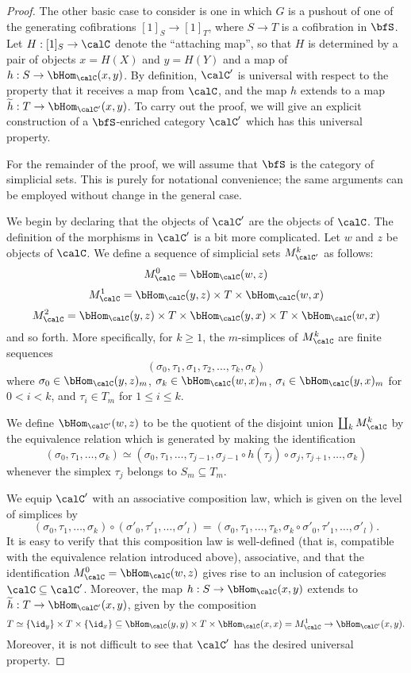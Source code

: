 \begin{Simplicial Categories}
\begin{proof}
The other basic case to consider is one in which $G$ is a pushout of one of the generating cofibrations $[1]_{S} \rightarrow [1]_{T}$, where $S \rightarrow T$ is a cofibration in $\bfS$. Let $H: [1]_{S} \rightarrow \calC$
denote the ``attaching map'', so that $H$ is determined by a pair of objects $x= H(X)$ and $y=H(Y)$
and a map of $h: S \rightarrow \bHom_{\calC}(x,y)$. 
By definition, $\calC'$ is universal
with respect to the property that it receives a map from $\calC$, and the map $h$ extends to a map
$\widetilde{h}: T \rightarrow \bHom_{\calC'}(x,y)$. To carry out the proof, we will give an explicit construction of a $\bfS$-enriched category $\calC'$ which has this universal property. 

For the remainder of the proof, we will assume that $\bfS$ is the category of simplicial sets.
This is purely for notational convenience; the same arguments can be employed without
change in the general case.

We begin by declaring that the objects of $\calC'$ are the objects of $\calC$. 
The definition of the morphisms in $\calC'$ is a bit more complicated. Let $w$ and $z$ be objects of $\calC$. We define a sequence of simplicial sets $M_{\calC'}^{k}$ as follows:
$$M_{\calC}^0 = \bHom_{\calC}(w,z)$$
$$M_{\calC}^1 = \bHom_{\calC}(y,z) \times T \times \bHom_{\calC}(w,x)$$
$$M_{\calC}^2 = \bHom_{\calC}(y,z) \times T \times \bHom_{\calC}(y,x) \times
T \times \bHom_{\calC}(w,x)$$ 
and so forth. More specifically, for $k \geq 1$, the $m$-simplices of $M_{\calC}^k$ are finite sequences
$$( \sigma_0, \tau_1, \sigma_1, \tau_2, \ldots, \tau_k, \sigma_k)$$ where 
$\sigma_0 \in \bHom_{\calC}(y,z)_m$, $\sigma_k \in \bHom_{\calC}(w,x)_m$, $\sigma_i \in \bHom_{\calC}(y,x)_m$ for $0 < i < k$, and $\tau_i \in T_m$ for $1 \leq i \leq k$.

We define $\bHom_{\calC'}(w,z)$ to be the quotient of the disjoint union
$ \coprod_{k} M_{\calC}^k$ by the equivalence relation which is generated by making the identification
$$( \sigma_0, \tau_1, \ldots, \sigma_k) \simeq (\sigma_0, \tau_1, \ldots, \tau_{j-1}, \sigma_{j-1} \circ h(\tau_j) \circ \sigma_{j}, \tau_{j+1}, \ldots, \sigma_k )$$ whenever the simplex $\tau_j$ belongs to $S_m \subseteq T_m$.

We equip $\calC'$ with an associative composition law, which is given on the level of simplices
by $$( \sigma_0, \tau_1, \ldots, \sigma_k ) \circ (\sigma'_0, \tau'_1, \ldots, \sigma'_l) =
(\sigma_0, \tau_1, \ldots, \tau_k, \sigma_k \circ \sigma'_0, \tau'_1, \ldots, \sigma'_l).$$
It is easy to verify that this composition law is well-defined (that is, compatible with the equivalence relation introduced above), associative, and that the identification $M_{\calC}^0 = \bHom_{\calC}(w,z)$ gives rise to an inclusion of categories $\calC \subseteq \calC'$. Moreover, the map 
$h: S \rightarrow \bHom_{\calC}(x,y)$ extends to $\widetilde{h}: T \rightarrow \bHom_{\calC'}(x,y)$, given by the composition
$$ T \simeq \{ \id_y \} \times T \times \{ \id_x\} \subseteq \bHom_{\calC}(y,y) \times T \times \bHom_{\calC}(x,x) = M_{\calC}^1 \rightarrow \bHom_{\calC'}(x,y).$$
Moreover, it is not difficult to see that $\calC'$ has the desired universal property.


\end{proof}
\end{Simplicial Categories}
